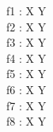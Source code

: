 \documentclass[a4paper,10pt,fleqn]{article}
\begin{document}
\begin{zed}
[X, Y]
\end{zed}

\begin{axdef}
f1 : X \pfun Y \\
f2 : X \fun Y \\
f3 : X \pinj Y \\
f4 : X \pinj Y \\
f5 : X \inj Y \\
f6 : X \psurj Y \\
f7 : X \surj Y \\
f8 : X \bij Y
\end{axdef}
\end{document}
